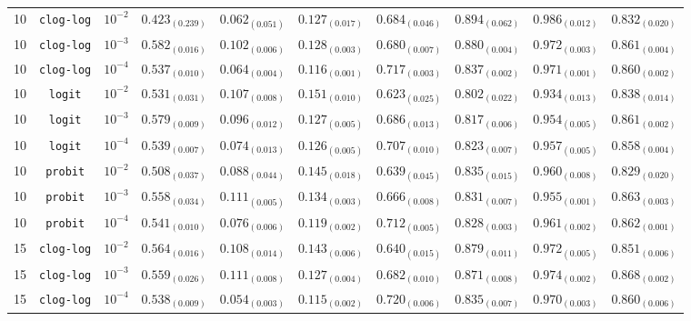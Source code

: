 \documentclass[journal]{IEEEtran}
\begin{document}
\begin{table}[!t]
\begin{tabular}{c@{\hskip 0.15cm}c@{\hskip 0.15cm}c@{\hskip 0.15cm}c@{\hskip 0.30cm}c@{\hskip 0.20cm}c@{\hskip 0.20cm}c@{\hskip 0.20cm}c@{\hskip 0.20cm}c@{\hskip 0.20cm}c}
			10 & \texttt{clog-log} & $10^{-2}$ & $0.423_{(0.239)}$ & $0.062_{(0.051)}$ & $0.127_{(0.017)}$ & $0.684_{(0.046)}$ & $\mathbf{0.894_{(0.062)}}$ & $\mathbf{0.986_{(0.012)}}$ & $0.832_{(0.020)}$\\
			10 & \texttt{clog-log} & $10^{-3}$ & $\mathbf{0.582_{(0.016)}}$ & $0.102_{(0.006)}$ & $0.128_{(0.003)}$ & $0.680_{(0.007)}$ & $\mathit{0.880_{(0.004)}}$ & $0.972_{(0.003)}$ & $0.861_{(0.004)}$\\
			10 & \texttt{clog-log} & $10^{-4}$ & $0.537_{(0.010)}$ & $0.064_{(0.004)}$ & $\mathit{0.116_{(0.001)}}$ & $0.717_{(0.003)}$ & $0.837_{(0.002)}$ & $0.971_{(0.001)}$ & $0.860_{(0.002)}$\\
			10 & \texttt{logit} & $10^{-2}$ & $0.531_{(0.031)}$ & $0.107_{(0.008)}$ & $0.151_{(0.010)}$ & $0.623_{(0.025)}$ & $0.802_{(0.022)}$ & $0.934_{(0.013)}$ & $0.838_{(0.014)}$\\
			10 & \texttt{logit} & $10^{-3}$ & $0.579_{(0.009)}$ & $0.096_{(0.012)}$ & $0.127_{(0.005)}$ & $0.686_{(0.013)}$ & $0.817_{(0.006)}$ & $0.954_{(0.005)}$ & $0.861_{(0.002)}$\\
			10 & \texttt{logit} & $10^{-4}$ & $0.539_{(0.007)}$ & $0.074_{(0.013)}$ & $0.126_{(0.005)}$ & $0.707_{(0.010)}$ & $0.823_{(0.007)}$ & $0.957_{(0.005)}$ & $0.858_{(0.004)}$\\
			10 & \texttt{probit} & $10^{-2}$ & $0.508_{(0.037)}$ & $0.088_{(0.044)}$ & $0.145_{(0.018)}$ & $0.639_{(0.045)}$ & $0.835_{(0.015)}$ & $0.960_{(0.008)}$ & $0.829_{(0.020)}$\\
			10 & \texttt{probit} & $10^{-3}$ & $0.558_{(0.034)}$ & $\mathbf{0.111_{(0.005)}}$ & $0.134_{(0.003)}$ & $0.666_{(0.008)}$ & $0.831_{(0.007)}$ & $0.955_{(0.001)}$ & $0.863_{(0.003)}$\\
			10 & \texttt{probit} & $10^{-4}$ & $0.541_{(0.010)}$ & $0.076_{(0.006)}$ & $0.119_{(0.002)}$ & $0.712_{(0.005)}$ & $0.828_{(0.003)}$ & $0.961_{(0.002)}$ & $0.862_{(0.001)}$\\
			15 & \texttt{clog-log} & $10^{-2}$ & $0.564_{(0.016)}$ & $0.108_{(0.014)}$ & $0.143_{(0.006)}$ & $0.640_{(0.015)}$ & $0.879_{(0.011)}$ & $0.972_{(0.005)}$ & $0.851_{(0.006)}$\\
			15 & \texttt{clog-log} & $10^{-3}$ & $0.559_{(0.026)}$ & $\mathit{0.111_{(0.008)}}$ & $0.127_{(0.004)}$ & $0.682_{(0.010)}$ & $0.871_{(0.008)}$ & $\mathit{0.974_{(0.002)}}$ & $\mathbf{0.868_{(0.002)}}$\\
			15 & \texttt{clog-log} & $10^{-4}$ & $0.538_{(0.009)}$ & $0.054_{(0.003)}$ & $\mathbf{0.115_{(0.002)}}$ & $0.720_{(0.006)}$ & $0.835_{(0.007)}$ & $0.970_{(0.003)}$ & $0.860_{(0.006)}$\\

\end{tabular}
\end{table}
\end{document}
